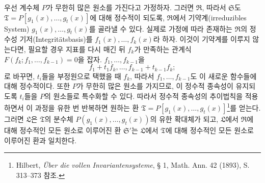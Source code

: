 \documentclass[11pt]{article}
\begin{document}
우선 계수체 $P$가 무한히 많은 원소를 가진다고 가정하자. 그러면 $\mathfrak R$, 따라서 $\mathfrak S$도 $\mathfrak T=P[g_1(x),\ldots,g_t(x)]$에 대해 정수적이 되도록, $\mathfrak R$에서 기약계(irreduzibles System) $g_1(x),\ldots,g_t(x)$를 골라낼 수 있다. 실제로 가정에 따라 존재하는 $\mathfrak R$의 정수성 기저(Integritätsbasis)를 $f_1(x),\ldots,f_k(x)$라 하자. 이것이 기약계를 이루지 않는다면, 필요할 경우 지표를 다시 매긴 뒤 $f_k$가 만족하는 관계식 $F(f_k;f_1,\ldots,f_{k-1})=0$을 잡자. $f_1,\ldots,f_{k-1}$을
\[
 f_1+t_1f_k,\ldots,f_{k-1}+t_{k-1}f_k;
\]
로 바꾸면, $t_i$들을 부정원으로 택했을 때 $f_k$, 따라서 $f_1,\ldots,f_{k-1}$도 이 새로운 함수들에 대해 정수적이다. 또한 $P$가 무한히 많은 원소를 가지므로, 이 정수적 종속성이 유지되도록 $t_i$들을 $P$의 원소들로 특수화할 수 있다. 따라서 정수적 종속성의 추이법칙을 적용하면서 이 과정을 유한 번 반복하면 원하는 환 $\mathfrak T=P[g_1(x),\ldots,g_t(x)]$\footnote{Hilbert, \emph{Über die vollen Invariantensysteme}, § 1, Math. Ann. 42 (1893), S. 313--373 참조.}를 얻는다. 그러면 $\mathfrak L$은 $\mathfrak T$의 분수체 $P(g_1(x),\ldots,g_t(x))$의 유한 확대체가 되고, $\mathfrak L$에서 $\mathfrak R$에 대해 정수적인 모든 원소로 이루어진 환 $\mathfrak S'$는 $\mathfrak L$에서 $\mathfrak T$에 대해 정수적인 모든 원소로 이루어진 환과 일치한다.
\end{document}
